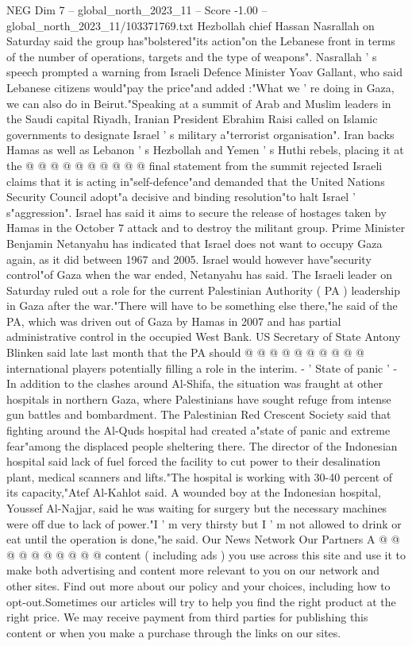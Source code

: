 \begin{textsample}{NEG Dim 7 – global\_north\_2023\_11 – Score -1.00 – global\_north\_2023\_11/103371769.txt}
Hezbollah chief Hassan Nasrallah on Saturday said the group has"bolstered"its action"on the Lebanese front in terms of the number of operations, targets and the type of weapons".
Nasrallah ' s speech prompted a warning from Israeli Defence Minister Yoav Gallant, who said Lebanese citizens would"pay the price"and added :"What we ' re doing in Gaza, we can also do in Beirut."Speaking at a summit of Arab and Muslim leaders in the Saudi capital Riyadh, Iranian President Ebrahim Raisi called on Islamic governments to designate Israel ' s military a"terrorist organisation".
Iran backs Hamas as well as Lebanon ' s Hezbollah and Yemen ' s Huthi rebels, placing it at the @ @ @ @ @ @ @ @ @ @ final statement from the summit rejected Israeli claims that it is acting in"self-defence"and demanded that the United Nations Security Council adopt"a decisive and binding resolution"to halt Israel ' s"aggression".
Israel has said it aims to secure the release of hostages taken by Hamas in the October 7 attack and to destroy the militant group.
Prime Minister Benjamin Netanyahu has indicated that Israel does not want to occupy Gaza again, as it did between 1967 and 2005.
Israel would however have"security control"of Gaza when the war ended, Netanyahu has said.
The Israeli leader on Saturday ruled out a role for the current Palestinian Authority ( PA ) leadership in Gaza after the war."There will have to be something else there,"he said of the PA, which was driven out of Gaza by Hamas in 2007 and has partial administrative control in the occupied West Bank.
US Secretary of State Antony Blinken said late last month that the PA should @ @ @ @ @ @ @ @ @ @ international players potentially filling a role in the interim. - ' State of panic ' - In addition to the clashes around Al-Shifa, the situation was fraught at other hospitals in northern Gaza, where Palestinians have sought refuge from intense gun battles and bombardment.
The Palestinian Red Crescent Society said that fighting around the Al-Quds hospital had created a"state of panic and extreme fear"among the displaced people sheltering there.
The director of the Indonesian hospital said lack of fuel forced the facility to cut power to their desalination plant, medical scanners and lifts."The hospital is working with 30-40 percent of its capacity,"Atef Al-Kahlot said.
A wounded boy at the Indonesian hospital, Youssef Al-Najjar, said he was waiting for surgery but the necessary machines were off due to lack of power."I ' m very thirsty but I ' m not allowed to drink or eat until the operation is done,"he said.
Our News Network Our Partners A @ @ @ @ @ @ @ @ @ @ content ( including ads ) you use across this site and use it to make both advertising and content more relevant to you on our network and other sites.
Find out more about our policy and your choices, including how to opt-out.Sometimes our articles will try to help you find the right product at the right price.
We may receive payment from third parties for publishing this content or when you make a purchase through the links on our sites.

\end{textsample}
